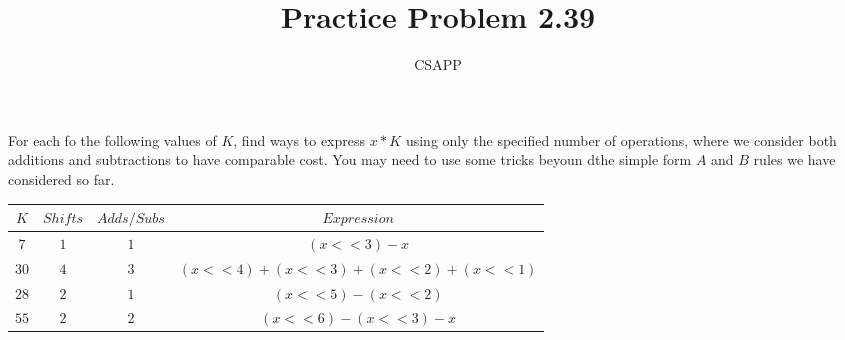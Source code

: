\documentclass{article}
\title{Practice Problem 2.39}
\author{CSAPP}
\begin{document}
    \maketitle
    \begin{flushleft}
        For each fo the following values of $K$, find ways to express $x \ast K$
        using only the specified number of operations, where we consider both additions and 
        subtractions to have comparable cost. You may need to use some tricks
        beyoun dthe simple form $A$ and $B$ rules we have considered so far.

        \begin{tabular}{cccc}
            $K$     & $Shifts$ & $Adds/Subs$ & $Expression$\\
            \midrule
            $7$  &   $1$  &  $1$ &   $(x<<3)-x$\\
            $30$ &   $4$  &  $3$ &   $(x<<4)+(x<<3)+(x<<2)+(x<<1)$\\
            $28$ &   $2$  &  $1$ &   $(x<<5)-(x<<2)$\\
            $55$ &   $2$  &  $2$ &   $(x<<6)-(x<<3)- x$\\
        \end{tabular}

    \end{flushleft}
\end{document}
